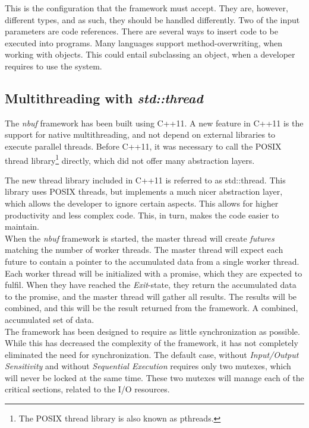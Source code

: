 \documentclass[a4paper]{article}
\newcommand{\nbuf}{\textit{nbuf} }
\begin{document}
This is the configuration that the framework must accept. They are, however, different types, and as such, they should be handled differently. Two of the input parameters are code references. There are several ways to insert code to be executed into programs. Many languages support method-overwriting, when working with objects. This could entail subclassing an object, when a developer requires to use the system. 



\subsection{Multithreading with \textit{std::thread}}
The \nbuf framework has been built using C++11. A new feature in C++11 is the support for native multithreading, and not depend on external libraries to execute parallel threads. Before C++11, it was necessary to call the POSIX thread library\footnote{The POSIX thread library is also known as pthreads.} directly, which did not offer many abstraction layers. 

The new thread library included in C++11 is referred to as std::thread. This library uses POSIX threads, but implements a much nicer abstraction layer, which allows the developer to ignore certain aspects. This allows for higher productivity and less complex code. This, in turn, makes the code easier to maintain.\\

When the \nbuf framework is started, the master thread will create \textit{futures} matching the number of worker threads. The master thread will expect each future to contain a pointer to the accumulated data from a single worker thread. Each worker thread will be initialized with a promise, which they are expected to fulfil. When they have reached the \textit{Exit}-state, they return the accumulated data to the promise, and the master thread will gather all results. The results will be combined, and this will be the result returned from the framework. A combined, accumulated set of data.\\

The framework has been designed to require as little synchronization as possible. While this has decreased the complexity of the framework, it has not completely eliminated the need for synchronization. The default case, without \textit{Input/Output Sensitivity} and without \textit{Sequential Execution} requires only two mutexes, which will never be locked at the same time. These two mutexes will manage each of the critical sections, related to the I/O resources. \\
\end{document}
